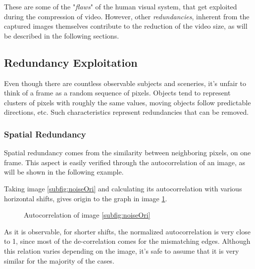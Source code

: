 These are some of the "\emph{flaws}" of the human visual system, that get exploited during the compression of video. However, other \emph{redundancies}, inherent from the captured images themselves contribute to the reduction of the video size, as will be described in the following sections.

\subsection{Redundancy Exploitation}


Even though there are countless observable subjects and sceneries, it's unfair to think of a frame as a random sequence of pixels. Objects tend to represent clusters of pixels with roughly the same values, moving objects follow predictable directions, etc. Such characteristics represent redundancies that can be removed.

\subsubsection{Spatial Redundancy} \label{sssec:spatred}

Spatial redundancy comes from the similarity between neighboring pixels, on one frame. This aspect is easily verified through the autocorrelation of an image, as will be shown in the following example.

Taking image \ref{subfig:noiseOri} and calculating its autocorrelation with various horizontal shifts, gives origin to the graph in image \ref{fig:autocorr}.

\begin{figure}[h]
    \centering
    \caption{Autocorrelation of image \ref{subfig:noiseOri}}
    \label{fig:autocorr}
\end{figure}

As it is observable, for shorter shifts, the normalized autocorrelation is very close to 1, since most of the de-correlation comes for the mismatching edges. Although this relation varies depending on the image, it's safe to assume that it is very similar for the majority of the cases.

